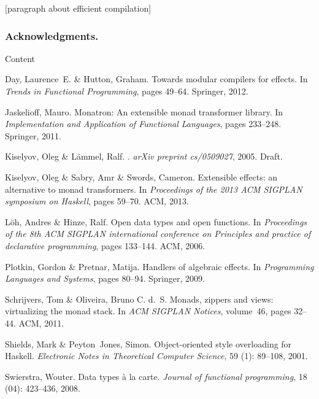 \documentclass[runningheads,a4paper]{llncs}
\newcommand{\todo}[1]{[{\color{blue}#1}]}
\begin{document}
\todo{paragraph about efficient compilation}

\subsubsection*{Acknowledgments.} Content

\begin{thebibliography}{4}

Day, Laurence~E. \& Hutton, Graham.
\newblock Towards modular compilers for effects.
\newblock In \emph{Trends in Functional Programming}, pages 49--64. Springer,
  2012.

Jaskelioff, Mauro.
\newblock Monatron: An extensible monad transformer library.
\newblock In \emph{Implementation and Application of Functional Languages},
  pages 233--248. Springer, 2011.
  
  Kiselyov, Oleg \& L{\"a}mmel, Ralf.
  .
  \newblock \emph{arXiv preprint cs/0509027}, 2005.
  \newblock Draft.

Kiselyov, Oleg \& Sabry, Amr \& Swords, Cameron.
\newblock Extensible effects: an alternative to monad transformers.
\newblock In \emph{Proceedings of the 2013 ACM SIGPLAN symposium on Haskell},
  pages 59--70. ACM, 2013.

L{\"o}h, Andres \& Hinze, Ralf.
\newblock Open data types and open functions.
\newblock In \emph{Proceedings of the 8th ACM SIGPLAN international conference
  on Principles and practice of declarative programming}, pages 133--144. ACM,
  2006.

Plotkin, Gordon \& Pretnar, Matija.
\newblock Handlers of algebraic effects.
\newblock In \emph{Programming Languages and Systems}, pages 80--94. Springer,
  2009.

Schrijvers, Tom \& Oliveira, Bruno C. d.~S.
\newblock Monads, zippers and views: virtualizing the monad stack.
\newblock In \emph{ACM SIGPLAN Notices}, volume~46, pages 32--44. ACM, 2011.

Shields, Mark \& Peyton~Jones, Simon.
\newblock Object-oriented style overloading for Haskell.
\newblock \emph{Electronic Notes in Theoretical Computer Science}, 59
  (1): 89--108, 2001.

Swierstra, Wouter.
\newblock Data types {\`a} la carte.
\newblock \emph{Journal of functional programming}, 18 (04):
  423--436, 2008.


\end{thebibliography}
\end{document}
